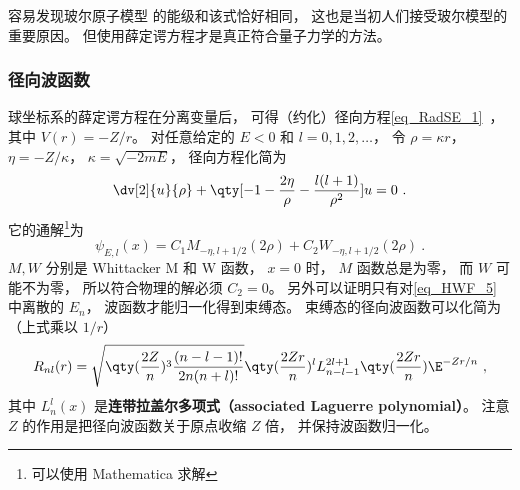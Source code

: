 容易发现玻尔原子模型 的能级和该式恰好相同， 这也是当初人们接受玻尔模型的重要原因。 但使用薛定谔方程才是真正符合量子力学的方法。

\subsubsection{径向波函数}
球坐标系的薛定谔方程在分离变量后， 可得（约化）径向方程\autoref{eq_RadSE_1}~， 其中 $V(r) = -Z/r$。 对任意给定的 $E < 0$ 和 $l = 0,1,2,\dots$， 令 $\rho = \kappa r$， $\eta = -Z/\kappa$， $\kappa = \sqrt{-2mE}$， 径向方程化简为
\begin{equation}
\dv[2]{u}{\rho} + \qty[-1 - \frac{2\eta}{\rho} - \frac{l(l+1)}{\rho^2}]u = 0~.
\end{equation}
它的通解\footnote{可以使用 Mathematica 求解}为
\begin{equation}\label{eq_HWF_6}
\psi_{E,l}(x) = C_1 M_{-\eta, l+1/2}(2 \rho) + C_2 W_{-\eta, l+1/2}(2 \rho)~.
\end{equation}
$M, W$ 分别是 Whittacker M 和 W 函数， $x = 0$ 时， $M$ 函数总是为零， 而 $W$ 可能不为零， 所以符合物理的解必须 $C_2 = 0$。 另外可以证明只有对\autoref{eq_HWF_5} 中离散的 $E_n$， 波函数才能归一化得到束缚态。 束缚态的径向波函数可以化简为（上式乘以 $1/r$）
\begin{equation}\label{eq_HWF_2}
R_{nl}(r) = \sqrt{\qty(\frac{2 Z}{n})^3 \frac{(n - l - 1)!}{2n (n + l)!}} \qty(\frac{2Zr}{n})^l  L_{n-l-1}^{2l+1}\qty(\frac{2Zr}{n}) \E^{-Zr/n}~,
\end{equation}
其中 $L_n^l(x)$ 是\textbf{连带拉盖尔多项式（associated Laguerre polynomial）}。 注意 $Z$ 的作用是把径向波函数关于原点收缩 $Z$ 倍， 并保持波函数归一化。

